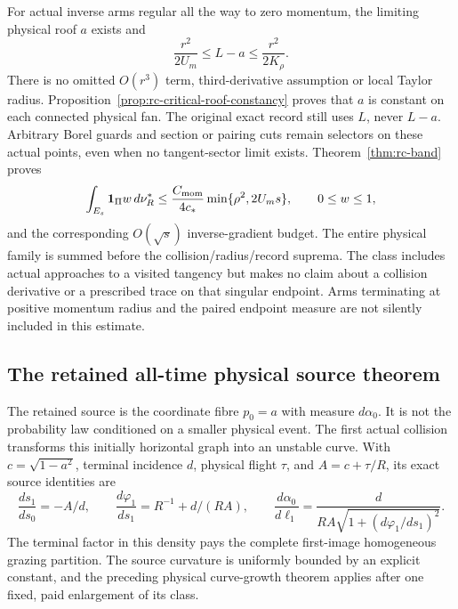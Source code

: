 \documentclass[11pt,reqno]{amsart}
\numberwithin{equation}{section}
\theoremstyle{definition}\newtheorem{definition}[theorem]{Definition}
\theoremstyle{remark}\newtheorem{remark}[theorem]{Remark}
\newcommand{\one}{\mathbf1}\newcommand{\dd}{\,\mathrm d}
\begin{document}
For actual inverse arms regular all the way to zero momentum, the
limiting physical roof $a$ exists and
\[
 \frac{r^2}{2U_m}\le L-a\le\frac{r^2}{2K_\rho}.
\]
There is no omitted $O(r^3)$ term, third-derivative assumption or local
Taylor radius. Proposition~\ref{prop:rc-critical-roof-constancy} proves
that $a$ is constant on each connected physical fan. The original exact
record still uses $L$, never $L-a$. Arbitrary Borel guards and section
or pairing cuts remain selectors on these actual points, even when
no tangent-sector limit exists. Theorem~\ref{thm:rc-band} proves
\[
 \int_{E_s}\one_\Pi w\,d\nu_R^*
 \le\frac{C_{\rm mom}}{4c_*}\min\{\rho^2,2U_m s\},
 \qquad 0\le w\le1,
\]
and the corresponding $O(\sqrt{s})$ inverse-gradient budget. The entire
physical family is summed before the collision/radius/record suprema.
The class includes actual approaches to a visited tangency but makes no
claim about a collision derivative or a prescribed trace on that
singular endpoint. Arms terminating at positive momentum radius and the
paired endpoint measure are not silently included in this estimate.

\subsection*{The retained all-time physical source theorem}
The retained source is the coordinate fibre $p_0=a$ with measure $d\alpha_0$.
It is not the probability law conditioned on a smaller physical event.
The first actual collision transforms this initially horizontal graph
into an unstable curve. With $c=\sqrt{1-a^2}$, terminal incidence $d$,
physical flight $\tau$, and $A=c+\tau/R$, its exact source identities are
\[
 \frac{ds_1}{ds_0}=-A/d,\qquad
 \frac{d\varphi_1}{ds_1}=R^{-1}+d/(RA),\qquad
 \frac{d\alpha_0}{d\ell_1}
     =\frac{d}{RA\sqrt{1+(d\varphi_1/ds_1)^2}}.
\]
The terminal factor in this density pays the complete first-image
homogeneous grazing partition. The source curvature is uniformly
bounded by an explicit constant, and the preceding physical curve-growth
theorem applies after one fixed, paid enlargement of its class.
\end{document}
